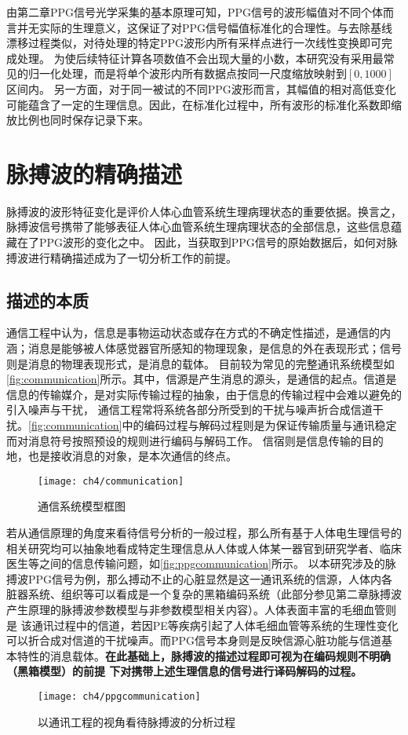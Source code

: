 由第二章PPG信号光学采集的基本原理可知，PPG信号的波形幅值对不同个体而言并无实际的生理意义，这保证了对PPG信号幅值标准化的合理性。与去除基线漂移过程类似，对待处理的特定PPG波形内所有采样点进行一次线性变换即可完成处理。
为使后续特征计算各项数值不会出现大量的小数，本研究没有采用最常见的归一化处理，而是将单个波形内所有数据点按同一尺度缩放映射到$[0,1000]$区间内。
另一方面，对于同一被试的不同PPG波形而言，其幅值的相对高低变化可能蕴含了一定的生理信息。因此，在标准化过程中，所有波形的标准化系数即缩放比例也同时保存记录下来。

\section{脉搏波的精确描述}
脉搏波的波形特征变化是评价人体心血管系统生理病理状态的重要依据\cite{PPGYY}。换言之，脉搏波信号携带了能够表征人体心血管系统生理病理状态的全部信息，这些信息蕴藏在了PPG波形的变化之中。
因此，当获取到PPG信号的原始数据后，如何对脉搏波进行精确描述成为了一切分析工作的前提。

\subsection{描述的本质}
通信工程中认为，信息是事物运动状态或存在方式的不确定性描述，是通信的内涵；消息是能够被人体感觉器官所感知的物理现象，是信息的外在表现形式；信号则是消息的物理表现形式，是消息的载体\cite{Shannon1948,Liu2019,Zhao2017}。
目前较为常见的完整通讯系统模型如\autoref{fig:communication}所示。其中，信源是产生消息的源头，是通信的起点。信道是信息的传输媒介，是对实际传输过程的抽象，由于信息的传输过程中会难以避免的引入噪声与干扰，
通信工程常将系统各部分所受到的干扰与噪声折合成信道干扰。\autoref{fig:communication}中的编码过程与解码过程则是为保证传输质量与通讯稳定而对消息符号按照预设的规则进行编码与解码工作。
信宿则是信息传输的目的地，也是接收消息的对象，是本次通信的终点\cite{Zhao2017}。
\begin{figure}[htbp]
    \centering
    \texttt{[image: ch4/communication]}
    \caption[通信系统模型框图]{\label{fig:communication}通信系统模型框图\cite{Zhao2017,Liu2019}}
\end{figure}

若从通信原理的角度来看待信号分析的一般过程，那么所有基于人体电生理信号的相关研究均可以抽象地看成特定生理信息从人体或人体某一器官到研究学者、临床医生等之间的信息传输问题，如\autoref{fig:ppgcommunication}所示。
以本研究涉及的脉搏波PPG信号为例，那么搏动不止的心脏显然是这一通讯系统的信源，人体内各脏器系统、组织等可以看成是一个复杂的黑箱编码系统（此部分参见第二章脉搏波产生原理的脉搏波参数模型与非参数模型相关内容）。人体表面丰富的毛细血管则是
该通讯过程中的信道，若因PE等疾病引起了人体毛细血管等系统的生理性变化可以折合成对信道的干扰噪声。而PPG信号本身则是反映信源心脏功能与信道基本特性的消息载体。\textbf{在此基础上，脉搏波的描述过程即可视为在编码规则不明确（黑箱模型）的前提
下对携带上述生理信息的信号进行译码解码的过程。}
\begin{figure}[htbp]
    \centering
    \texttt{[image: ch4/ppgcommunication]}
    \caption{\label{fig:ppgcommunication}以通讯工程的视角看待脉搏波的分析过程}
\end{figure}

